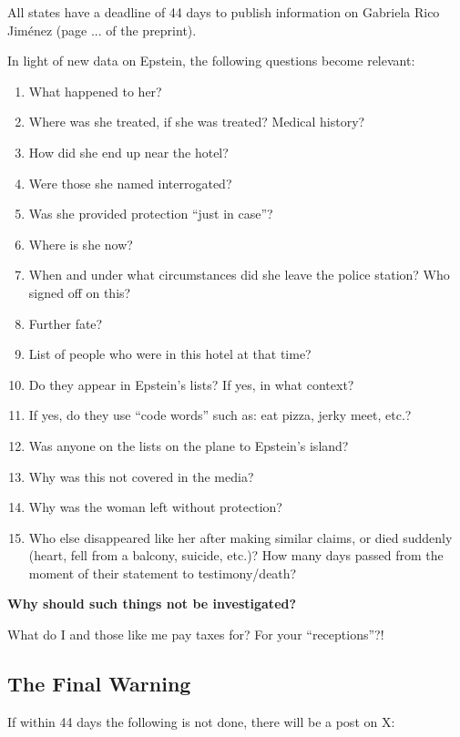 \documentclass[11pt,a4paper]{article}
\theoremstyle{definition}
\theoremstyle{remark}
\begin{document}
All states have a deadline of 44 days to publish information on Gabriela Rico Jiménez (page ... of the preprint).

In light of new data on Epstein, the following questions become relevant:
\begin{enumerate}
\item What happened to her?
\item Where was she treated, if she was treated? Medical history?
\item How did she end up near the hotel?
\item Were those she named interrogated?
\item Was she provided protection ``just in case''?
\item Where is she now?
\item When and under what circumstances did she leave the police station? Who signed off on this?
\item Further fate?
\item List of people who were in this hotel at that time?
\item Do they appear in Epstein's lists? If yes, in what context?
\item If yes, do they use ``code words'' such as: eat pizza, jerky meet, etc.?
\item Was anyone on the lists on the plane to Epstein's island?
\item Why was this not covered in the media?
\item Why was the woman left without protection?
\item Who else disappeared like her after making similar claims, or died suddenly (heart, fell from a balcony, suicide, etc.)? How many days passed from the moment of their statement to testimony/death?
\end{enumerate}

\textbf{Why should such things not be investigated?}

What do I and those like me pay taxes for? For your ``receptions''?!

\subsection{The Final Warning}

If within 44 days the following is not done, there will be a post on X:
\end{document}
